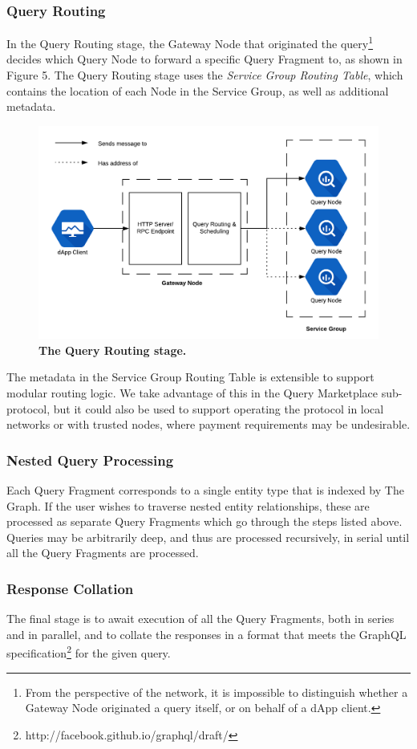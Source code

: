 \documentclass[12pt]{article}
\begin{document}
\subsubsection*{Query Routing}
In the Query Routing stage, the Gateway Node that originated the query\footnote{From the perspective of the network, it is impossible to distinguish whether a Gateway Node originated a query itself, or on behalf of a dApp client.} decides which Query Node to forward a specific Query Fragment to, as shown in Figure 5. The Query Routing stage uses the \textit{Service Group Routing Table}, which contains the location of each Node in the Service Group, as well as additional metadata.
\begin{figure}[H]
\caption{\textbf{The Query Routing stage.}}
\begin{center}
\includegraphics[width=.9\textwidth]{media/image9.png}
\end{center}
\end{figure}
\noindent
The metadata in the Service Group Routing Table is extensible to support modular routing logic. We take advantage of this in the Query Marketplace sub-protocol, but it could also be used to support operating the protocol in local networks or with trusted nodes, where payment requirements may be undesirable.
\subsubsection*{Nested Query Processing}
Each Query Fragment corresponds to a single entity type that is indexed by The Graph. If the user wishes to traverse nested entity relationships, these are processed as separate Query Fragments which go through the steps listed above. Queries may be arbitrarily deep, and thus are processed recursively, in serial until all the Query Fragments are processed.
\subsubsection*{Response Collation}
The final stage is to await execution of all the Query Fragments, both in series and in parallel, and to collate the responses in a format that meets the GraphQL specification\footnote{http://facebook.github.io/graphql/draft/} for the given query.
\end{document}
